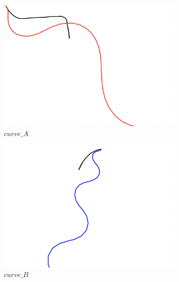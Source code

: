 \begin{figure}[H]
     \centering
     \begin{subfigure}[b]{0.31\textwidth}
         \centering
         \includegraphics[width=\textwidth]{images/ddpg_results/envs_S3_S4_S5/S5_A2_R3_curve_A.png}
         \caption{$curve\_A$}
     \end{subfigure}
     \hfill
     \begin{subfigure}[b]{0.31\textwidth}
         \centering
         \includegraphics[width=\textwidth]{images/ddpg_results/envs_S3_S4_S5/S5_A2_R3_curve_B.png}
         \caption{$curve\_B$}
     \end{subfigure}
     \hfill
     \begin{subfigure}[b]{0.31\textwidth}
         \centering

\end{subfigure}
\end{figure}
